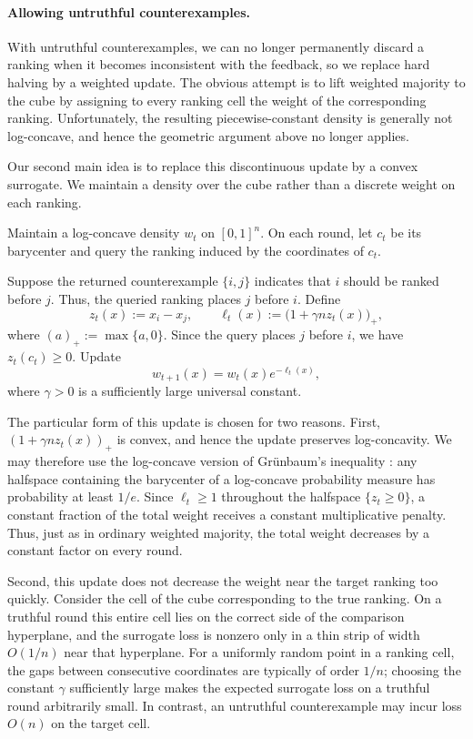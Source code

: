 \documentclass[11pt]{article}
\theoremstyle{definition}
\theoremstyle{remark}
\begin{document}
\paragraph{Allowing untruthful counterexamples.}
With untruthful counterexamples, we can no longer permanently discard a
ranking when it becomes inconsistent with the feedback, so we replace hard
halving by a weighted update. The obvious attempt is to lift weighted majority to
the cube by assigning to every ranking cell the weight of the corresponding
ranking. Unfortunately, the resulting piecewise-constant density is generally
not log-concave, and hence the geometric argument above no longer applies.

Our second main idea is to replace this discontinuous update by a convex
surrogate. We maintain a density over the cube rather than a discrete weight
on each ranking.
\begin{algorithmbox}
Maintain a log-concave density $w_t$ on $[0,1]^n$. On each round, let $c_t$
be its barycenter and query the ranking induced by the coordinates of $c_t$.

Suppose the returned counterexample $\{i,j\}$ indicates that $i$ should be
ranked before $j$. Thus, the queried ranking places $j$ before $i$. Define
\[
    z_t(x):=x_i-x_j,
    \qquad
    \ell_t(x):=\bigl(1+\gamma n z_t(x)\bigr)_+,
\]
where $(a)_+:=\max\{a,0\}$. Since the query places $j$ before $i$, we have
$z_t(c_t)\geq0$. Update
\[
    w_{t+1}(x)=w_t(x)e^{-\ell_t(x)},
\]
where $\gamma>0$ is a sufficiently large universal constant.
\end{algorithmbox}
The particular form of this update is chosen for two reasons. First,
$(1+\gamma n z_t(x))_+$ is convex, and hence the update preserves log-concavity. We may therefore use the log-concave version of Gr\"unbaum's
inequality \cite{LovaszVempala2007}: any halfspace containing the barycenter
of a log-concave probability measure has probability at least $1/e$.
Since $\ell_t\geq 1$ throughout the halfspace $\{z_t\geq0\}$, a constant
fraction of the total weight receives a constant multiplicative penalty.
Thus, just as in ordinary weighted majority, the total weight decreases by
a constant factor on every round.

Second, this update does not decrease the weight near the target ranking too
quickly. Consider the cell of the cube corresponding to the true ranking.
On a truthful round this entire cell lies on the correct side of the
comparison hyperplane, and the surrogate loss is nonzero only in a thin strip
of width $O(1/n)$ near that hyperplane. For a uniformly random point in a
ranking cell, the gaps between consecutive coordinates are typically of order
$1/n$; choosing the constant $\gamma$ sufficiently large makes the expected
surrogate loss on a truthful round arbitrarily small. In contrast, an
untruthful counterexample may incur loss $O(n)$ on the target cell.
\end{document}
